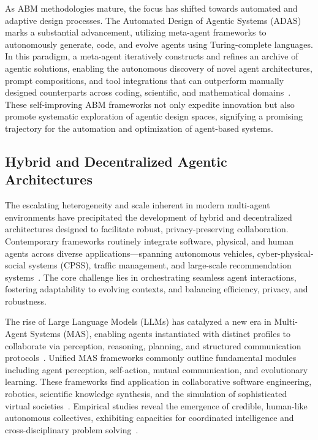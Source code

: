 \documentclass[sigconf]{acmart}
\begin{document}
As ABM methodologies mature, the focus has shifted towards automated and adaptive design processes. The Automated Design of Agentic Systems (ADAS) marks a substantial advancement, utilizing meta-agent frameworks to autonomously generate, code, and evolve agents using Turing-complete languages. In this paradigm, a meta-agent iteratively constructs and refines an archive of agentic solutions, enabling the autonomous discovery of novel agent architectures, prompt compositions, and tool integrations that can outperform manually designed counterparts across coding, scientific, and mathematical domains~\cite{ref103}. These self-improving ABM frameworks not only expedite innovation but also promote systematic exploration of agentic design spaces, signifying a promising trajectory for the automation and optimization of agent-based systems.

\subsection{Hybrid and Decentralized Agentic Architectures}

The escalating heterogeneity and scale inherent in modern multi-agent environments have precipitated the development of hybrid and decentralized architectures designed to facilitate robust, privacy-preserving collaboration. Contemporary frameworks routinely integrate software, physical, and human agents across diverse applications—spanning autonomous vehicles, cyber-physical-social systems (CPSS), traffic management, and large-scale recommendation systems~\cite{ref13,ref22,ref25,ref26,ref27,ref41,ref42,ref43,ref44,ref54,ref55,ref56,ref60,ref69,ref70,ref83,ref85,ref101}. The core challenge lies in orchestrating seamless agent interactions, fostering adaptability to evolving contexts, and balancing efficiency, privacy, and robustness.

The rise of Large Language Models (LLMs) has catalyzed a new era in Multi-Agent Systems (MAS), enabling agents instantiated with distinct profiles to collaborate via perception, reasoning, planning, and structured communication protocols~\cite{ref101,ref105,ref106}. Unified MAS frameworks commonly outline fundamental modules including agent perception, self-action, mutual communication, and evolutionary learning. These frameworks find application in collaborative software engineering, robotics, scientific knowledge synthesis, and the simulation of sophisticated virtual societies~\cite{ref101,ref105}. Empirical studies reveal the emergence of credible, human-like autonomous collectives, exhibiting capacities for coordinated intelligence and cross-disciplinary problem solving~\cite{ref101}.
\end{document}
